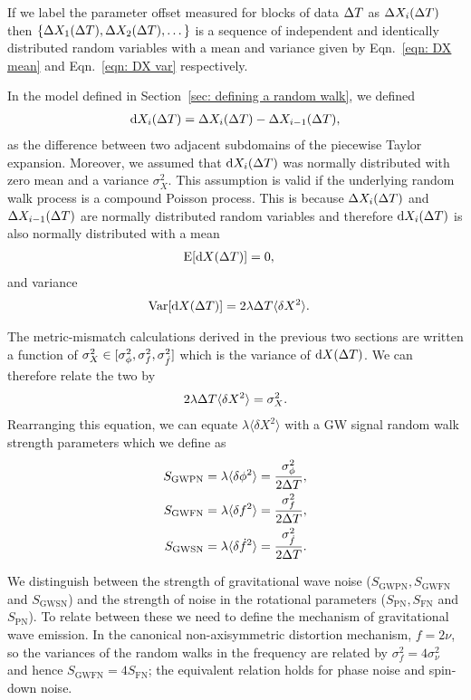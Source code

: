 \documentclass[../full_thesis/full_thesis.tex]{subfiles}
\begin{document}
{If we label the parameter offset measured for blocks of data $\Delta T$ as  $\Delta
X_{i}(\Delta T)$ then $\{\Delta X_{1}(\Delta T), \Delta X_{2}(\Delta T), \dots\}$ is a
sequence of independent and identically distributed random variables with a mean
and variance given by Eqn.~\eqref{eqn: DX mean} and Eqn.~\eqref{eqn: DX var}
respectively.

In the model defined in Section~\ref{sec: defining a random walk}, we defined
\begin{align}
\mathrm{d} X_{i}(\Delta T) =  \Delta X_{i}(\Delta T) - \Delta X_{i-1}(\Delta T),
\end{align}
as the difference between two adjacent subdomains of the piecewise Taylor
expansion. Moreover, we assumed that $\mathrm{d} X_i(\Delta T)$ was normally distributed
with zero mean and a variance $\sigma_{X}^{2}$. 
This assumption is valid if the underlying random walk process is a compound
Poisson process. This is because $\Delta X_{i}(\Delta T)$ and $\Delta X_{i-1}(\Delta T)$ are normally
distributed random variables and therefore $\mathrm{d} X_i (\Delta T)$ is also normally
distributed with a mean
\begin{align}
\textrm{E}[\mathrm{d} X(\Delta T)] & = 0,
\label{eqn: Poisson expectation}
\end{align}
and variance
\begin{align}
\textrm{Var}[\mathrm{d} X(\Delta T)] &  = 2\lambda \Delta T \langle \delta X^{2}\rangle.
\label{eqn: Poisson variance}
\end{align}

The metric-mismatch calculations derived in the previous two sections are
written a function of $\sigma_{X}^{2} \in [\sigma_{\phi}^{2}, \sigma_{f}^{2}, \sigma_{\dot{f}}^{2}]$
which is the variance of $\mathrm{d} X(\Delta T)$. We can therefore relate the two by
\begin{align}
2\lambda \Delta T \langle \delta X^{2}\rangle = \sigma_{X}^{2}.
\end{align}
Rearranging this equation, we can equate $\lambda \langle \delta X^2\rangle$ with
a GW signal random walk strength parameters which we define as
\begin{align}
S_{\mathrm{GWPN}} & = \lambda \langle \delta \phi^{2} \rangle = 
\frac{\sigma_{\phi}^{2}}{2\Delta T}, \label{eqn: SPN 2}\\
S_{\mathrm{GWFN}} & = \lambda \langle \delta f^{2} \rangle = 
\frac{\sigma_{f}^{2}}{2\Delta T}, \label{eqn: SFN 2}\\
S_{\mathrm{GWSN}} & = \lambda \langle \delta \dot{f}^{2} \rangle = 
\frac{\sigma_{\dot{f}}^{2}}{2\Delta T}.  \label{eqn: SSN 2}
\end{align}

We distinguish between the strength of gravitational wave noise
($S_{\textrm{GWPN}}, S_{\textrm{GWFN}}$ and $S_{\textrm{GWSN}}$) and the
strength of noise in the rotational parameters ($S_{\textrm{PN}},
S_{\textrm{FN}}$ and $S_{\textrm{PN}}$). To relate between these we need to
define the mechanism of gravitational wave emission. In the canonical
non-axisymmetric distortion mechanism, $f = 2\nu$, so the variances of the
random walks in the frequency are related by $\sigma_{f}^{2} = 4
\sigma_{\nu}^{2}$ and hence $S_{\textrm{GWFN}} = 4S_{\textrm{FN}}$; the
equivalent relation holds for phase noise and spin-down noise.

}
\end{document}
